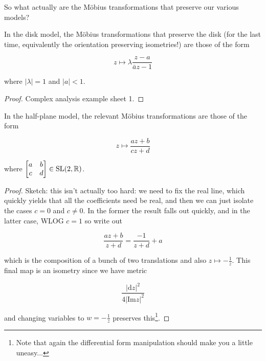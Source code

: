 \documentclass[11pt]{scrartcl}
\begin{document}
So what actually are the M{\"o}bius transformations that preserve our various models?

\begin{proposition}
In the disk model, the M{\"o}bius transformations that preserve the disk (for the last time, equivalently the orientation preserving isometries!) are those of the form

\begin{equation}
z \mapsto \lambda \frac{z-a}{\bar{a}z-1}
\end{equation}

where $|\lambda|=1$ and $|a|<1$.

\begin{proof}
Complex analysis example sheet 1.
\end{proof}
\end{proposition}

\begin{proposition}
In the half-plane model, the relevant M{\"o}bius transformations are those of the form

\begin{equation}
    z \mapsto \frac{az+b}{cz+d}
\end{equation}

where $\begin{bmatrix} a & b \\ c & d\end{bmatrix} \in \text{SL}(2, \mathbb R)$.

\begin{proof}
Sketch: this isn't actually too hard: we need to fix the real line, which quickly yields that all the coefficients need be real, and then we can just isolate the cases $c=0$ and $c \neq 0$. In the former the result falls out quickly, and in the latter case, WLOG $c=1$ so write out

\begin{equation}
    \frac{az+b}{z+d} = \frac{-1}{z+d} + a
\end{equation}

which is the composition of a bunch of two translations and also $z \mapsto - \frac1z$. This final map is an isometry since we have metric

\begin{equation}
    \frac{|\mathrm{d}z|^2}{4 |\text{Im} z|^2}    
\end{equation}

and changing variables to $w = -\frac1z$ preserves this\footnote{Note that again the differential form manipulation should make you a little uneasy...}.
\end{proof}
\end{proposition}
\end{document}
